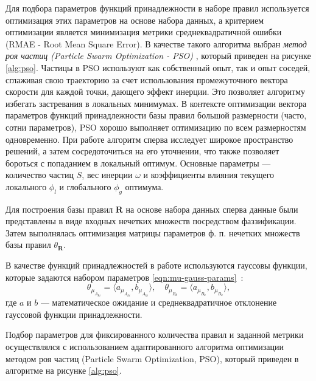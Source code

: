 Для подбора параметров функций принадлежности в наборе правил используется оптимизация этих параметров на основе набора данных, а критерием оптимизации является минимизация метрики среднеквадратичной ошибки (RMAE - Root Mean Square Error). В качестве такого алгоритма выбран \textit{метод роя частиц (Particle Swarm Optimization - PSO)} \cite{Kennedy1995,Davari2009,Kazakova2022PSOReview}, который приведен на рисунке \cref{alg:pso}. Частицы в PSO используют как собственный опыт, так и опыт соседей, сглаживая свою траекторию за счет использования промежуточного вектора скорости для каждой точки, дающего эффект инерции. Это позволяет алгоритму избегать застревания в локальных минимумах. В контексте оптимизации вектора параметров функций принадлежности базы правил большой размерности (часто, сотни параметров), PSO хорошо выполняет оптимизацию по всем размерностям одновременно. При работе алгоритм сперва исследует широкое пространство решений, а затем сосредоточиться на его уточнении, что также позволяет бороться с попаданием в локальный оптимум. Основные параметры --- количество частиц $S$, вес инерции $\omega$ и коэффициенты влияния текущего локального $\phi_l$ и глобального $\phi_g$ оптимума.

Для построения базы правил $\mathbf{R}$ на основе набора данных сперва данные были представлены в виде входных нечетких множеств посредством фаззификации. Затем выполнялась оптимизация матрицы параметров ф. п. нечетких множеств базы правил $\theta_{\mathbf{R}}$.

В качестве функций принадлежностей в работе используются гауссовы функции, которые задаются набором параметров \eqref{eqn:mu-gauss-params}~\cite{Leonenkov2005FuzzyModeling,Pegat2009FuzzyModeling}:
\begin{equation}
	\label{eqn:mu-gauss-params}
	\theta_{\mu_{A_{ki}}} = \langle a_{\mu_{A_{ki}}}, b_{\mu_{A_{ki}}}\rangle,\quad\theta_{\mu_{B_{k}}} = \langle a_{\mu_{B_{k}}}, b_{\mu_{B_{k}}}\rangle,
\end{equation}
где $a$ и $b$ --- математическое ожидание и среднеквадратичное отклонение гауссовой функции принадлежности.

Подбор параметров для фиксированного количества правил и заданной метрики осуществлялся с использованием адаптированного алгоритма оптимизации методом роя частиц (Particle Swarm Optimization, PSO), который приведен в алгоритме на рисунке \cref{alg:pso}.

\FloatBarrier

